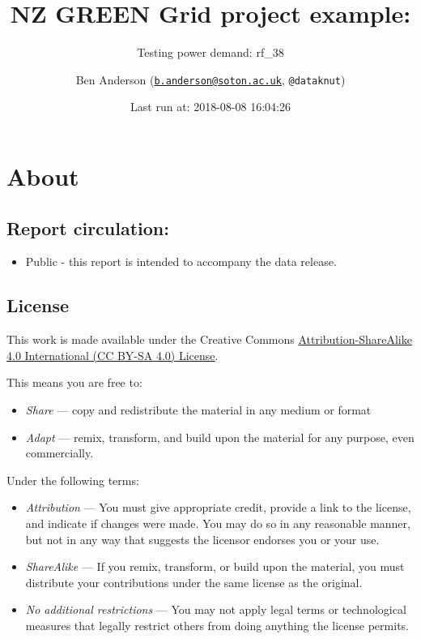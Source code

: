 \documentclass[]{article}
\title{NZ GREEN Grid project example:}
\subtitle{Testing power demand: rf\_38}
\author{Ben Anderson
(\href{mailto:b.anderson@soton.ac.uk}{\nolinkurl{b.anderson@soton.ac.uk}},
\texttt{@dataknut})}
\date{Last run at: 2018-08-08 16:04:26}
\providecommand{\tightlist}{%
  \setlength{\itemsep}{0pt}\setlength{\parskip}{0pt}}
\theoremstyle{definition}
\theoremstyle{definition}
\theoremstyle{definition}
\theoremstyle{remark}
\begin{document}
\maketitle

{
\setcounter{tocdepth}{2}
\tableofcontents
}
\newpage

\section{About}\label{about}

\subsection{Report circulation:}\label{report-circulation}

\begin{itemize}
\tightlist
\item
  Public - this report is intended to accompany the data release.
\end{itemize}

\subsection{License}\label{license}

This work is made available under the Creative Commons
\href{https://creativecommons.org/licenses/by-sa/4.0/}{Attribution-ShareAlike
4.0 International (CC BY-SA 4.0) License}.

This means you are free to:

\begin{itemize}
\tightlist
\item
  \emph{Share} --- copy and redistribute the material in any medium or
  format
\item
  \emph{Adapt} --- remix, transform, and build upon the material for any
  purpose, even commercially.
\end{itemize}

Under the following terms:

\begin{itemize}
\tightlist
\item
  \emph{Attribution} --- You must give appropriate credit, provide a
  link to the license, and indicate if changes were made. You may do so
  in any reasonable manner, but not in any way that suggests the
  licensor endorses you or your use.
\item
  \emph{ShareAlike} --- If you remix, transform, or build upon the
  material, you must distribute your contributions under the same
  license as the original.
\item
  \emph{No additional restrictions} --- You may not apply legal terms or
  technological measures that legally restrict others from doing
  anything the license permits.
\end{itemize}
\end{document}
